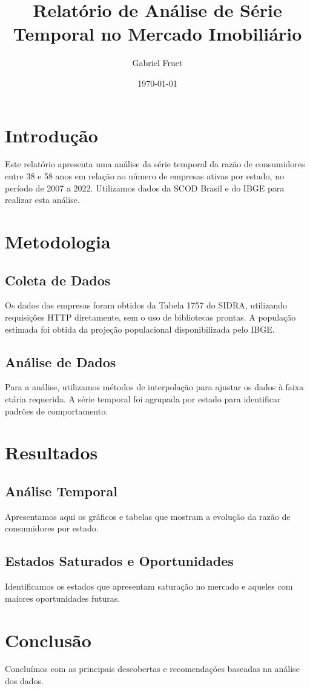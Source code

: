 \documentclass[12pt]{article} \usepackage[utf8]{inputenc}
\title{Relatório de Análise de Série Temporal no Mercado Imobiliário}
\author{Gabriel Fruet} \date{\today}
\begin{document}
\maketitle

\section{Introdução} Este relatório apresenta uma análise da série temporal da
razão de consumidores entre 38 e 58 anos em relação ao número de empresas
ativas por estado, no período de 2007 a 2022. Utilizamos dados da SCOD Brasil e
do IBGE para realizar esta análise.

\section{Metodologia} \subsection{Coleta de Dados} Os dados das empresas foram
obtidos da Tabela 1757 do SIDRA, utilizando requisições HTTP diretamente, sem o
uso de bibliotecas prontas. A população estimada foi obtida da projeção
populacional disponibilizada pelo IBGE.

\subsection{Análise de Dados} Para a análise, utilizamos métodos de
interpolação para ajustar os dados à faixa etária requerida. A série temporal
foi agrupada por estado para identificar padrões de comportamento.

\section{Resultados} \subsection{Análise Temporal} Apresentamos aqui os
gráficos e tabelas que mostram a evolução da razão de consumidores por estado.

\subsection{Estados Saturados e Oportunidades} Identificamos os estados que
apresentam saturação no mercado e aqueles com maiores oportunidades futuras.

\section{Conclusão} Concluímos com as principais descobertas e recomendações
baseadas na análise dos dados.
\end{document}
